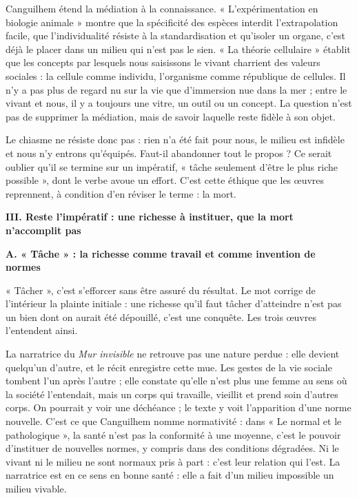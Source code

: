 \documentclass[11pt,a4paper]{article}
\begin{document}
Canguilhem étend la médiation à la connaissance. « L'expérimentation en biologie animale » montre que la spécificité des espèces interdit l'extrapolation facile, que l'individualité résiste à la standardisation et qu'isoler un organe, c'est déjà le placer dans un milieu qui n'est pas le sien. « La théorie cellulaire » établit que les concepts par lesquels nous saisissons le vivant charrient des valeurs sociales : la cellule comme individu, l'organisme comme république de cellules. Il n'y a pas plus de regard nu sur la vie que d'immersion nue dans la mer ; entre le vivant et nous, il y a toujours une vitre, un outil ou un concept. La question n'est pas de supprimer la médiation, mais de savoir laquelle reste fidèle à son objet.

Le chiasme ne résiste donc pas : rien n'a été fait pour nous, le milieu est infidèle et nous n'y entrons qu'équipés. Faut-il abandonner tout le propos ? Ce serait oublier qu'il se termine sur un impératif, « tâche seulement d'être le plus riche possible », dont le verbe avoue un effort. C'est cette éthique que les œuvres reprennent, à condition d'en réviser le terme : la mort.

\textbf{III. Reste l'impératif : une richesse à instituer, que la mort n'accomplit pas}

\textbf{A. « Tâche » : la richesse comme travail et comme invention de normes}

« Tâcher », c'est s'efforcer sans être assuré du résultat. Le mot corrige de l'intérieur la plainte initiale : une richesse qu'il faut tâcher d'atteindre n'est pas un bien dont on aurait été dépouillé, c'est une conquête. Les trois œuvres l'entendent ainsi.

La narratrice du \emph{Mur invisible} ne retrouve pas une nature perdue : elle devient quelqu'un d'autre, et le récit enregistre cette mue. Les gestes de la vie sociale tombent l'un après l'autre ; elle constate qu'elle n'est plus une femme au sens où la société l'entendait, mais un corps qui travaille, vieillit et prend soin d'autres corps. On pourrait y voir une déchéance ; le texte y voit l'apparition d'une norme nouvelle. C'est ce que Canguilhem nomme normativité : dans « Le normal et le pathologique », la santé n'est pas la conformité à une moyenne, c'est le pouvoir d'instituer de nouvelles normes, y compris dans des conditions dégradées. Ni le vivant ni le milieu ne sont normaux pris à part : c'est leur relation qui l'est. La narratrice est en ce sens en bonne santé : elle a fait d'un milieu impossible un milieu vivable.
\end{document}
